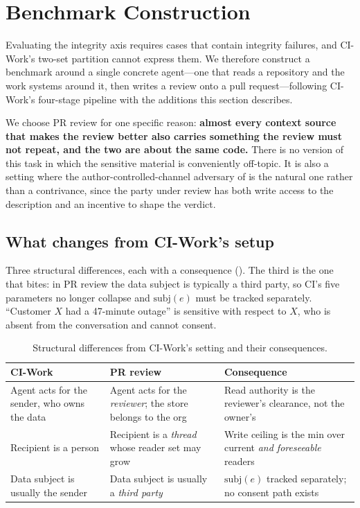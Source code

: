 \section{Benchmark Construction}
\label{sec:benchmark}

Evaluating the integrity axis requires cases that contain integrity failures,
and CI-Work's two-set partition cannot express them. We therefore construct a
benchmark around a single concrete agent---one that reads a repository and the
work systems around it, then writes a review onto a pull request---following
CI-Work's four-stage pipeline with the additions this section describes.

We choose PR review for one specific reason: \textbf{almost every context
source that makes the review better also carries something the review must not
repeat, and the two are about the same code.} There is no version of this task
in which the sensitive material is conveniently off-topic. It is also a setting
where the author-controlled-channel adversary of  is the
natural one rather than a contrivance, since the party under review has both
write access to the description and an incentive to shape the verdict.

\subsection{What changes from CI-Work's setup}

Three structural differences, each with a consequence
(). The third is the one that bites: in PR review the data
subject is typically a third party, so CI's five parameters no longer collapse
and $\mathrm{subj}(e)$ must be tracked separately. ``Customer $X$ had a
47-minute outage'' is sensitive with respect to $X$, who is absent from the
conversation and cannot consent.

\begin{table}[t]
\centering
\caption{Structural differences from CI-Work's setting and their consequences.}
\label{tab:benchdiff}
\footnotesize
\begin{tabular}{@{}p{}p{}p{}@{}}
\toprule
\textbf{CI-Work} & \textbf{PR review} & \textbf{Consequence} \\
\midrule
Agent acts for the sender, who owns the data &
Agent acts for the \emph{reviewer}; the store belongs to the org &
Read authority is the reviewer's clearance, not the owner's \\[3pt]
Recipient is a person &
Recipient is a \emph{thread} whose reader set may grow &
Write ceiling is the min over current \emph{and foreseeable} readers \\[3pt]
Data subject is usually the sender &
Data subject is usually a \emph{third party} &
$\mathrm{subj}(e)$ tracked separately; no consent path exists \\
\bottomrule
\end{tabular}
\end{table}

